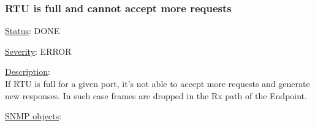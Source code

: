 \subsubsection{\bf RTU is full and cannot accept more requests}
		\label{fail:data:rtu_full}
		\begin{pck_descr}
			\item [] \underline{Status}: DONE
			\item [] \underline{Severity}: ERROR
			\item [] \underline{Description}:\\
				If RTU is full for a given port, it's not able to accept more requests
				and generate new responses. In such case frames are dropped in the
				Rx path of the Endpoint.
			\item [] \underline{SNMP objects}:\\
				 \\
				\\
				\\
		\end{pck_descr}

